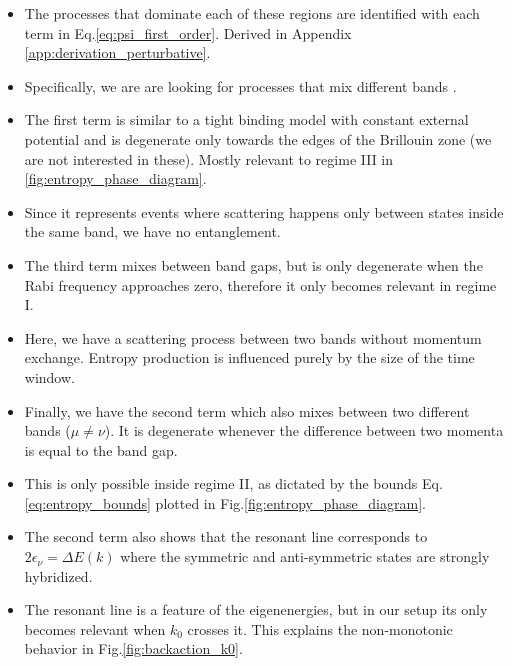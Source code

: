 \documentclass[10pt,
 amsmath,amssymb,
 aps,prb, twocolumn
]{revtex4-2}
\begin{document}
\begin{itemize}
    \item The processes that dominate each of these regions are identified with each term in Eq.\eqref{eq:psi_first_order}. Derived in Appendix \ref{app:derivation_perturbative}.

    \item Specifically, we are are looking for processes that mix different bands .

    \item The first term is similar to a tight binding model with constant external potential and is degenerate only towards the edges of the Brillouin zone (we are not interested in these). Mostly relevant to regime III in \ref{fig:entropy_phase_diagram}.
    
    \item Since it represents events where scattering happens only between states inside the same band, we have no entanglement. 

    \item The third term mixes between band gaps, but is only degenerate when the Rabi frequency approaches zero, therefore it only becomes relevant in regime I.

    \item Here, we have a scattering process between two bands without momentum exchange. Entropy production is influenced purely by the size of the time window.

    \item Finally, we have the second term which also mixes between two different bands ($\mu \neq \nu$). It is degenerate whenever the difference between two momenta is equal to the band gap.

    \item This is only possible inside regime II, as dictated by the bounds Eq.\eqref{eq:entropy_bounds} plotted in Fig.\ref{fig:entropy_phase_diagram}.

    \item The second term also shows that the resonant line corresponds to $2\epsilon_\nu = \Delta E(k)$ where the symmetric and anti-symmetric states are strongly hybridized. 

    \item The resonant line is a feature of the eigenenergies, but in our setup its only becomes relevant when $k_0$ crosses it. This explains the non-monotonic behavior in Fig.\ref{fig:backaction_k0}.


\end{itemize}
\end{document}
